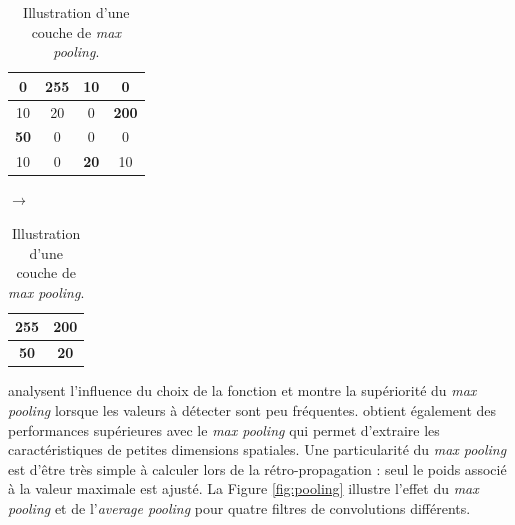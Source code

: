 \begin{table}[hbtp]
    \centering
    \begin{tabular}{|c|c||c|c|}
        \hline
                  0 & \textbf{255} &          10 &            0 \\ \hline
                 10 &           20 &           0 & \textbf{200} \\ \hline \hline
        \textbf{50} &            0 &           0 &            0 \\ \hline
                 10 &            0 & \textbf{20} &           10 \\ \hline
    \end{tabular}
    \quad
    $\rightarrow$
    \quad
    \begin{tabular}{|c||c|}
        \hline
        \textbf{255} & \textbf{200} \\ \hline \hline
        \textbf{50}  & \textbf{20}  \\ \hline
    \end{tabular}
    \caption{Illustration d'une couche de \emph{max pooling}.}
    \label{tab:maxpooling}
\end{table}

\citeauthor{boureau_theoretical_2010} \cite{boureau_theoretical_2010} analysent l'influence du choix de la fonction et montre la supériorité du \textit{max pooling} lorsque les valeurs à détecter sont peu fréquentes.
\citeauthor{scherer_evaluation_2010} \cite{scherer_evaluation_2010} obtient également des performances supérieures avec le \textit{max pooling} qui permet d'extraire les caractéristiques de petites dimensions spatiales.
Une particularité du \textit{max pooling} est d'être très simple à calculer lors de la rétro-propagation : seul le poids associé à la valeur maximale est ajusté.
La Figure \ref{fig:pooling} illustre l'effet du \textit{max pooling} et de l'\textit{average pooling} pour quatre filtres de convolutions différents.


